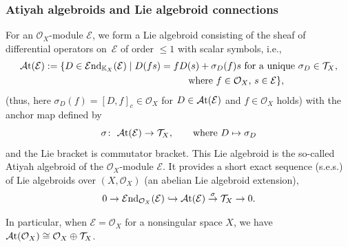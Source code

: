 \documentclass[pdftex]{sigma}
\numberwithin{equation}{section}
\theoremstyle{definition}
\begin{document}
\subsubsection{Atiyah algebroids and Lie algebroid connections} \label{Atiyah and Lie connections}
For an $\mathcal{O}_X$-module $\mathcal{E}$, we form a Lie algebroid consisting of the sheaf of differential operators on~$\mathcal{E}$ of order $\leq 1$ with scalar symbols, i.e.,
\begin{gather*}
\mathcal{A}{\rm t}(\mathcal{E}):= \{D\in \mathcal{E}{\rm nd}_{\mathbb{K}_X}(\mathcal{E})\mid
D(fs)=fD(s)+\sigma_D(f)s \ \text{for a unique} \ \sigma_D\in \mathcal{T}_X, \\
\hphantom{\mathcal{A}{\rm t}(\mathcal{E}):= \{D\in \mathcal{E}{\rm nd}_{\mathbb{K}_X}(\mathcal{E})\mid{}}{} \text{where} \ f \in \mathcal{O}_X,\, s\in \mathcal{E}\},
\end{gather*}
(thus, here $\sigma_D(f)=[D, f]_c \in \mathcal{O}_X$ for $D \in \mathcal{A}{\rm t}(\mathcal{E})$ and $f \in \mathcal{O}_X$ holds) with the anchor map defined by
\[
	 \sigma\colon \ \mathcal{A}{\rm t}(\mathcal{E}) \rightarrow \mathcal{T}_X,\qquad \text{where $D \mapsto \sigma_D$}
\]
and the Lie bracket is commutator bracket. This Lie algebroid is the so-called Atiyah algebroid of the $\mathcal{O}_X$-module $\mathcal{E}$. It provides a short exact sequence (s.e.s.) of Lie algebroids over $(X, \mathcal{O}_X)$
(an abelian Lie algebroid extension),
\begin{align}\label{Lie algebroid extension}
	0 \rightarrow \mathcal{E}{\rm nd}_{\mathcal{O}_X}(\mathcal{E}) \hookrightarrow \mathcal{A}{\rm t}(\mathcal{E}) \overset{\sigma}{\rightarrow} \mathcal{T}_X \rightarrow 0.
\end{align}

In particular, when $\mathcal{E}=\mathcal{O}_X$ for a nonsingular space $X$, we have $\mathcal{A}{\rm t}(\mathcal{O}_X)\cong \mathcal{O}_X \oplus \mathcal{T}_X$.
\end{document}
